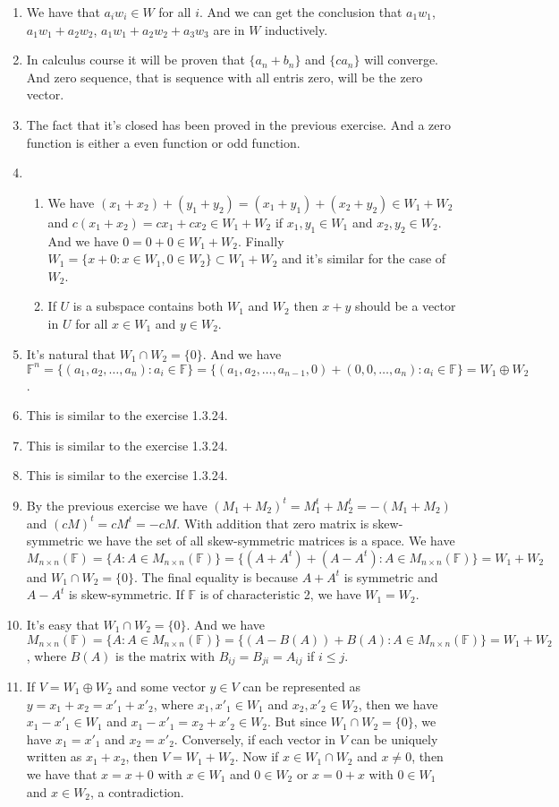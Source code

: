\begin{enumerate}
\item We have that $a_i w_i\in W$ for all $i$. And we can get the conclusion that $a_1w_1$, $a_1w_1+a_2w_2$, $a_1w_1+a_2w_2+a_3w_3$ are in $W$ inductively.
\item In calculus course it will be proven that $\{a_n+b_n\}$ and $\{ca_n\}$ will converge. And zero sequence, that is sequence with all entris zero, will be the zero vector.
\item The fact that it's closed has been proved in the previous exercise. And a zero function is either a even function or odd function.
\item 
\begin{enumerate}
\item We have $(x_1+x_2)+(y_1+y_2)=(x_1+y_1)+(x_2+y_2)\in W_1+W_2$ and $c(x_1+x_2)=cx_1+cx_2\in W_1+W_2$ if $x_1,y_1\in W_1$ and $x_2,y_2\in W_2$. And we have $0=0+0\in W_1+W_2$. Finally $W_1=\{x+0:x\in W_1, 0\in W_2\}\subset W_1+W_2$ and it's similar for the case of $W_2$.
\item If $U$ is a subspace contains both $W_1$ and $W_2$ then $x+y$ should be a vector in $U$ for all $x\in W_1$ and $y\in W_2$.
\end{enumerate}
\item It's natural that $W_1\cap W_2=\{0\}$. And we have $\mathbb{F}^n=\{(a_1,a_2,\dots ,a_n):a_i\in \mathbb{F}\}=\{(a_1,a_2,\dots ,a_{n-1},0)+(0,0,\dots ,a_n):a_i\in \mathbb{F}\}=W_1\oplus W_2$.
\item This is similar to the exercise 1.3.24.
\item This is similar to the exercise 1.3.24.
\item This is similar to the exercise 1.3.24.
\item By the previous exercise we have $(M_1+M_2)^t=M_1^t+M_2^t=-(M_1+M_2)$ and $(cM)^t=cM^t=-cM$. With addition that zero matrix is skew-symmetric we have the set of all skew-symmetric matrices is a space. We have $M_{n\times n}(\mathbb{F})=\{A:A \in M_{n\times n}(\mathbb{F})\}=\{(A+A^t)+(A-A^t):A \in M_{n\times n}(\mathbb{F})\}=W_1+ W_2$ and $W_1\cap W_2=\{0\}$. The final equality is because $A+A^t$ is symmetric and $A-A^t$ is skew-symmetric. If $\mathbb{F}$ is of characteristic 2, we have $W_1=W_2$.
\item It's easy that $W_1\cap W_2=\{0\}$. And we have $M_{n\times n}(\mathbb{F})=\{A:A \in M_{n\times n}(\mathbb{F})\}=\{(A-B(A))+B(A):A \in M_{n\times n}(\mathbb{F})\}=W_1+ W_2$, where $B(A)$ is the matrix with $B_{ij}=B_{ji}=A_{ij}$ if $i\leq j$.
\item If $V=W_1\oplus W_2$ and some vector $y\in V$ can be represented as $y=x_1+x_2=x'_1+x'_2$, where $x_1,x'_1\in W_1$ and $x_2,x'_2\in W_2$, then we have $x_1-x'_1\in W_1$ and $x_1-x'_1=x_2+x'_2 \in W_2$. But since $W_1\cap W_2=\{0\}$, we have $x_1=x'_1$ and $x_2=x'_2$. Conversely, if each vector in $V$ can be uniquely written as $x_1+x_2$, then $V=W_1+W_2$. Now if $x\in W_1\cap W_2$ and $x\neq 0$, then we have that $x=x+0$ with $x\in W_1$ and $0\in W_2$ or $x=0+x$ with $0\in W_1$ and $x\in W_2$, a contradiction.

\end{enumerate}
